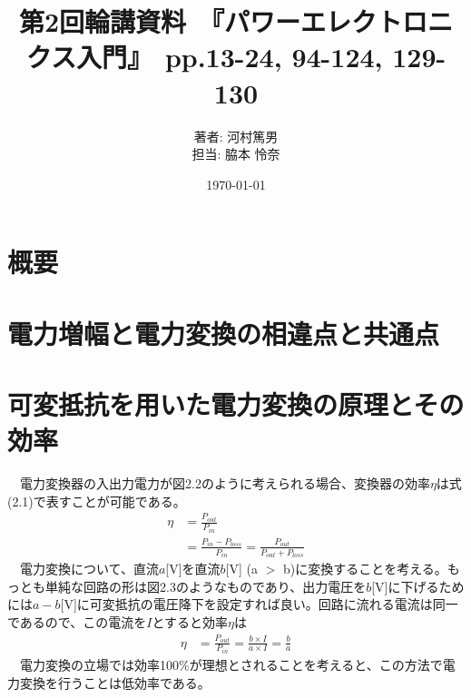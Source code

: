 \documentclass{article}
\begin{document}
\title{第2回輪講資料　『パワーエレクトロニクス入門』　pp.13-24, 94-124, 129-130}
\author{著者: 河村篤男 \\ 担当: 脇本 怜奈}
\date{\today}
\maketitle

\section*{概要}

\setcounter{section}{0}
\renewcommand{\thesection}{2.\arabic{section}}

\section{電力増幅と電力変換の相違点と共通点}

\section{可変抵抗を用いた電力変換の原理とその効率}
　電力変換器の入出力電力が図2.2のように考えられる場合、変換器の効率\(\eta\)は式(2.1)で表すことが可能である。\\
 \begin{align}
    \eta &= \frac{P_{out}}{P_{in}} \\
      &= \frac{P_{in} - P_{loss}}{P_{in}} = \frac{P_{out}}{P_{out}+P_{loss}}
\end{align}
　電力変換について、直流\(a\)[V]を直流\(b\)[V] (a \(>\) b)に変換することを考える。もっとも単純な回路の形は図2.3のようなものであり、出力電圧を\(b\)[V]に下げるためには\(a-b\)[V]に可変抵抗の電圧降下を設定すれば良い。回路に流れる電流は同一であるので、この電流を\(I\)とすると効率\(\eta\)は
\begin{align}
    \eta &= \frac{P_{out}}{P_{in}} = \frac{b\times I }{a \times I} = \frac{b}{a}
\end{align}
　電力変換の立場では効率100\(\%\)が理想とされることを考えると、この方法で電力変換を行うことは低効率である。
\end{document}
